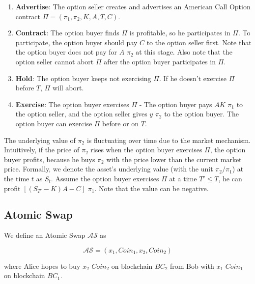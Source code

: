 \begin{enumerate}
    \item \textbf{Advertise}: The option seller creates and advertises an American Call Option contract $\Pi = (\pi_1, \pi_2, K, A, T, C)$.
    \item \textbf{Contract}: The option buyer finds $\Pi$ is profitable, so he participates in $\Pi$.
    To participate, the option buyer should pay $C$ to the option seller first.
    Note that the option buyer does not pay for $A$ $\pi_2$ at this stage.
    Also note that the option seller cannot abort $\Pi$ after the option buyer participates in $\Pi$.
    \item \textbf{Hold}: The option buyer keeps not exercising $\Pi$. If he doesn't exercise $\Pi$ before $T$, $\Pi$ will abort.
    \item \textbf{Exercise}: The option buyer exercises $\Pi$ - The option buyer pays $AK$ $\pi_1$ to the option seller, and the option seller gives $y$ $\pi_2$ to the option buyer. The option buyer can exercise $\Pi$ before or on $T$.
\end{enumerate}

The underlying value of $\pi_2$ is fluctuating over time due to the market mechanism.
Intuitively, if the price of $\pi_2$ rises when the option buyer exercises $\Pi$, the option buyer profits, because he buys $\pi_2$ with the price lower than the current market price.
Formally, we denote the asset's underlying value (with the unit $\pi_2 / \pi_1$) at the time $t$ as $S_t$.
Assume the option buyer exercises $\Pi$ at a time $T' \leq T$, he can profit $[(S_{T'} - K) A - C]$ $\pi_1$.
Note that the value can be negative.










\subsection{Atomic Swap}

\begin{definition}
We define an Atomic Swap $\mathcal{AS}$ as

$$\mathcal{AS} = (x_1, Coin_1, x_2, Coin_2)$$

where Alice hopes to buy $x_2$ $Coin_2$ on blockchain $BC_2$ from Bob with $x_1$ $Coin_1$ on blockchain $BC_1$.
\end{definition}

